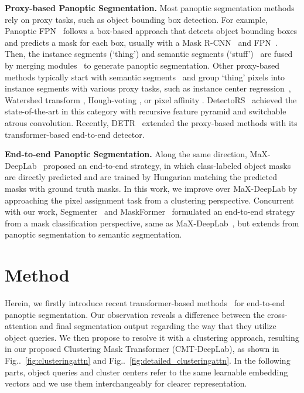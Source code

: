 \documentclass[10pt,twocolumn,letterpaper]{article}
\makeatletter
\DeclareRobustCommand\onedot{\futurelet\@let@token\@onedot}
\def\@onedot{\ifx\@let@token.\else.\null\fi\xspace}
\newcommand{\figref}[1]{Fig\onedot~\ref{#1}}
\makeatother
\begin{document}
\vspace{1ex}
\noindent\textbf{Proxy-based Panoptic Segmentation.}
Most panoptic segmentation methods rely on proxy tasks, such as object bounding box detection. For example, Panoptic FPN~\cite{kirillov2019panoptic} follows a box-based approach that detects object bounding boxes and predicts a mask for each box, usually with a Mask R-CNN~\cite{he2017mask} and FPN~\cite{lin2017feature}. Then, the instance segments (`thing') and semantic segments (`stuff')~\cite{chen2018deeplabv2} are fused by merging modules~\cite{li2018learning,li2018attention,porzi2019seamless,liu2019e2e,yang2020sognet,xiong2019upsnet,li2020unifying} to generate panoptic segmentation. Other proxy-based methods typically start with semantic segments~\cite{deeplabv12015,chen2017deeplabv3,deeplabv3plus2018} and group `thing' pixels into instance segments with various proxy tasks, such as instance center regression~\cite{kendall2018multi,uhrig2018box2pix,neven2019instance,yang2019deeperlab,cheng2019panoptic,wang2020axial,li2021fully}, Watershed transform \cite{vincent1991watersheds,bai2017deep,bonde2020towards}, Hough-voting \cite{ballard1981generalizing,leibe2004combined,bonde2020towards}, or pixel affinity \cite{keuper2015efficient,liu2018affinity,sofiiuk2019adaptis,gao2019ssap,bonde2020towards}. DetectoRS~\cite{qiao2020detectors} achieved the state-of-the-art in this category with recursive feature pyramid and switchable atrous convolution.
Recently, DETR~\cite{carion2020end} extended the proxy-based methods with its transformer-based end-to-end detector.

\vspace{1ex}
\noindent\textbf{End-to-end Panoptic Segmentation.}
Along the same direction, MaX-DeepLab~\cite{wang2021max} proposed an end-to-end strategy, in which class-labeled object masks are directly predicted and are trained by Hungarian matching the predicted masks with ground truth masks.
In this work, we improve over MaX-DeepLab by approaching the pixel assignment task from a clustering perspective.
Concurrent with our work, Segmenter~\cite{strudel2021segmenter} and MaskFormer~\cite{cheng2021per} formulated an end-to-end strategy from a mask classification perspective, same as MaX-DeepLab~\cite{wang2021max}, but extends from panoptic segmentation to semantic segmentation.
 \section{Method}

Herein, we firstly introduce recent transformer-based methods~\cite{wang2021max} for end-to-end panoptic segmentation. Our observation reveals a difference between the cross-attention and final segmentation output regarding the way that they utilize object queries. We then propose to resolve it
with a clustering approach,
resulting in our proposed Clustering Mask Transformer (CMT-DeepLab), as shown in \figref{fig:clusteringattn} and \figref{fig:detailed_clusteringattn}. In the following parts, object queries and cluster centers refer to the same learnable embedding vectors and we use them interchangeably for clearer representation.
\end{document}
